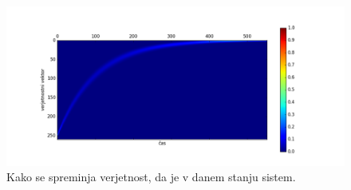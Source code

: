 \documentclass[slovene,11pt,a4paper]{article}
\numberwithin{equation}{section} %
\numberwithin{figure}{section} %
\numberwithin{table}{section} %
\begin{document}
\begin{figure}[h]
\begin{center}
\begin{minipage}{\textwidth}
\centering
\includegraphics[scale=0.6]{slike/matrika_porazdelitve_beta_0.png}
\end{minipage}\hfill
\end{center}
\caption{Kako se spreminja verjetnost, da je v danem stanju sistem.}
\end{figure}
\end{document}
